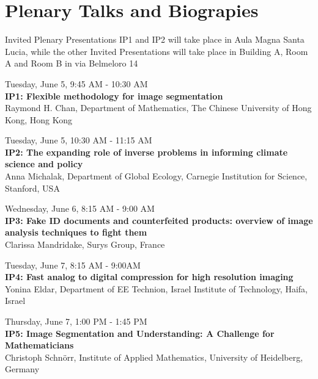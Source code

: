 \chapter*{Plenary Talks and Biograpies}

{\small{Invited Plenary Presentations  IP1 and IP2 will take place in Aula Magna Santa Lucia, while the other Invited Presentations will take place in Building A, Room A and Room B in via Belmeloro 14}}

\begin{center}{\large{
      Tuesday, June 5, 9:45 AM - 10:30 AM \\
      \textbf{IP1: Flexible methodology for image segmentation}\\
Raymond H. Chan, Department of Mathematics, The Chinese University of Hong Kong,  Hong Kong}}\\
\end{center}

\begin{center}{\large{
Tuesday, June 5, 10:30 AM - 11:15 AM \\
\textbf{IP2: The expanding role of inverse problems in informing climate science and policy}\\
Anna Michalak, Department of Global Ecology, Carnegie Institution for Science, Stanford, USA}}\\
\end{center}

\begin{center}{\large{
Wednesday, June 6, 8:15 AM - 9:00 AM \\
\textbf{IP3: Fake ID documents and counterfeited products: overview of image analysis techniques to fight them}\\
Clarissa Mandridake, Surys Group, France}}\\
\end{center}

\begin{center}{\large{
Tuesday, June 7, 8:15 AM - 9:00AM \\
\textbf{IP4: Fast analog to digital compression for high resolution imaging}\\
Yonina Eldar, Department of EE Technion, Israel Institute of Technology, Haifa, Israel
}}\\
\end{center}

\begin{center}{\large{
Thursday, June 7, 1:00 PM - 1:45 PM \\
\textbf{IP5: Image Segmentation and Understanding: A Challenge for Mathematicians}\\
Christoph Schn\"{o}rr, Institute of Applied Mathematics, University of Heidelberg, Germany}}\\
\end{center}


